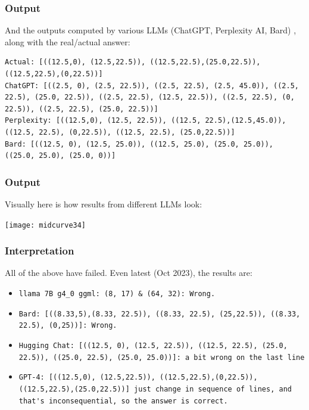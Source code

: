 \begin{frame}[fragile]\frametitle{Output}
And the outputs computed by various LLMs (ChatGPT, Perplexity AI, Bard) , along with the real/actual answer:

\begin{lstlisting}
Actual: [((12.5,0), (12.5,22.5)), ((12.5,22.5),(25.0,22.5)), ((12.5,22.5),(0,22.5))]
ChatGPT: [((2.5, 0), (2.5, 22.5)), ((2.5, 22.5), (2.5, 45.0)), ((2.5, 22.5), (25.0, 22.5)), ((2.5, 22.5), (12.5, 22.5)), ((2.5, 22.5), (0, 22.5)), ((2.5, 22.5), (25.0, 22.5))]
Perplexity: [((12.5,0), (12.5, 22.5)), ((12.5, 22.5),(12.5,45.0)), ((12.5, 22.5), (0,22.5)), ((12.5, 22.5), (25.0,22.5))]
Bard: [((12.5, 0), (12.5, 25.0)), ((12.5, 25.0), (25.0, 25.0)), ((25.0, 25.0), (25.0, 0))]
\end{lstlisting}	
\end{frame}

\begin{frame}[fragile]\frametitle{Output}

Visually here is how results from different LLMs look:

\begin{center}
\texttt{[image: midcurve34]}
\end{center}	
\end{frame}

\begin{frame}[fragile]\frametitle{Interpretation}

All of the above have failed. Even latest (Oct 2023), the results are:
\begin{itemize}
\item \lstinline|llama 7B g4_0 ggml: (8, 17) & (64, 32): Wrong.|
\item \lstinline|Bard: [((8.33,5),(8.33, 22.5)), ((8.33, 22.5), (25,22.5)), ((8.33, 22.5), (0,25))]: Wrong.|
\item \lstinline|Hugging Chat: [((12.5, 0), (12.5, 22.5)), ((12.5, 22.5), (25.0, 22.5)), ((25.0, 22.5), (25.0, 25.0))]: a bit wrong on the last line|
\item \lstinline|GPT-4: [((12.5,0), (12.5,22.5)), ((12.5,22.5),(0,22.5)), ((12.5,22.5),(25.0,22.5))] just change in sequence of lines, and that's inconsequential, so the answer is correct.|
\end{itemize}	
\end{frame}

